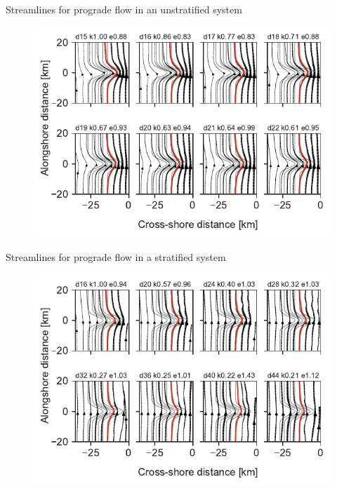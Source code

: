\documentclass{beamer}
\begin{document}
\begin{frame}{Streamlines for prograde flow in an unstratified system}
\begin{figure}
\centering
\includegraphics{figures/streamlines_Unstratified_z95_from_south_canyon_period1_k.pdf}
\end{figure}
\end{frame}

\begin{frame}{Streamlines for prograde flow in a stratified system}
\begin{figure}
\centering
\includegraphics{figures/streamlines_Stratified_z95_from_south_canyon_period1_k.pdf}
\end{figure}
\end{frame}
\end{document}
